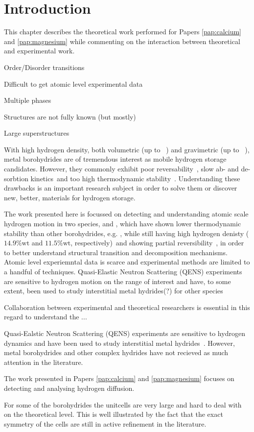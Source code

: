 \section{Introduction}
\label{sec:borohydrides-introduction}

This chapter describes the theoretical work performed for Papers \ref{pap:calcium} and \ref{pap:magnesium} while commenting on the interaction between theoretical and experimental work.

\bit
\item Order/Disorder transitions
\item Difficult to get atomic level experimental data
\item Multiple phases
\item Structures are not fully known (but mostly)
\item Large superstructures
\eit

With high hydrogen density, both volumetric (up to \missing{}~\citemiss) and gravimetric (up to \missing{}~\citemiss), metal borohydrides are of tremendous interest as mobile hydrogen storage candidates.
However, they commonly exhibit poor reversability~\citemiss, slow ab- and de-sorbtion kinetics~\citemiss and too high thermodynamic stability~\citemiss.
Understanding these drawbacks is an important research subject in order to solve them or discover new, better, materials for hydrogen storage.

The work presented here is focussed on detecting and understanding atomic scale hydrogen motion in two species,  and , which have shown lower thermodynamic stability than other borohydrides, e.g. , while still having high hydrogen denisty ($14.9\%\text{wt}$ and $11.5\%\text{wt}$, respectively)~\citemiss and showing partial reversibility~\citemiss, in order to better understand structural transition and decomposition mechanisms.
Atomic level experiemntal data is scarce and experimental methods are limited to a handful of techniques.
Quasi-Elastic Neutron Scattering (QENS) experiments are sensitive to hydrogen motion on the range of interest and have, to some extent, been used to study interstitial metal hydrides(?) for other species

Collaboration between experimental and theoretical researchers is essential in this regard to understand the ...

Quasi-Ealstic Neutron Scattering (QENS) experiments are sensitive to hydrogen dynamics and have been used to study interstitial metal hydrides~\citemiss.
However, metal borohydrides and other complex hydrides have not recieved as much attention in the literature.

The work presented in Papers \ref{pap:calcium} and \ref{pap:magnesium} focuses on detecting and analysing hydrogen diffusion.

For some of the borohydrides the unitcells are very large and hard to deal with on the theoretical level.
This is well illustrated by the fact that the exact symmetry of the cells are still in active refinement in the literature.~\citemiss

